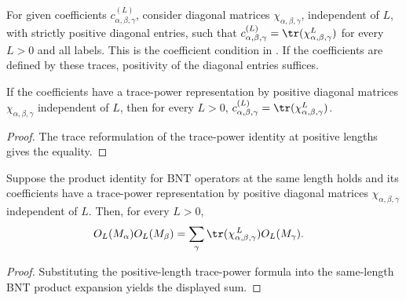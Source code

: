 \begin{definition}%
    \label{def:mpdo_positive_bnt_label_chi_trace_power_form}
    \leanok
    For given coefficients $c^{(L)}_{\alpha,\beta,\gamma}$, consider diagonal
    matrices $\chi_{\alpha,\beta,\gamma}$, independent of $L$, with strictly
    positive diagonal entries, such that
    $c^{(L)}_{\alpha,\beta,\gamma}=\tr(\chi_{\alpha,\beta,\gamma}^{L})$
    for every $L>0$ and all labels. This is the coefficient condition in
    \cite[Theorem~4.14(ii)]{Cirac2016MPDO_arXiv}.
    If the coefficients are defined by these traces, positivity of the
    diagonal entries suffices.
\end{definition}

\begin{lemma}%
    \label{lem:mpdo_positive_bnt_label_chi_eq_trace_matrix_pow}
    \leanok
    If the coefficients have a trace-power representation by positive
    diagonal matrices $\chi_{\alpha,\beta,\gamma}$ independent of $L$, then
    for every $L>0$,
    $c^{(L)}_{\alpha,\beta,\gamma}
        =\tr(\chi_{\alpha,\beta,\gamma}^{L})$.
\end{lemma}
\begin{proof}\leanok
    The trace reformulation of the trace-power identity at positive lengths
    gives the equality.
\end{proof}

\begin{lemma}%
    \label{thm:mpdo_bnt_label_same_length_product_eq_sum_chi_trace_pow}
    \leanok
    Suppose the product identity for BNT operators at the same length holds
    and its coefficients have a trace-power representation by positive
    diagonal matrices $\chi_{\alpha,\beta,\gamma}$ independent of $L$.
    Then, for every $L>0$,
    \begin{align}
        O_L(M_\alpha)O_L(M_\beta)
         & =
        \sum_\gamma
        \tr(\chi_{\alpha,\beta,\gamma}^{\,L})
        O_L(M_\gamma).
        \notag
    \end{align}
\end{lemma}
\begin{proof}\leanok
    Substituting the positive-length trace-power formula into the same-length BNT
    product expansion yields the displayed sum.
\end{proof}

